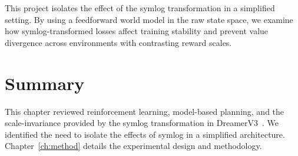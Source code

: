 This project isolates the effect of the symlog transformation in a simplified setting. By using a feedforward world model in the raw state space, we examine how symlog-transformed losses affect training stability and prevent value divergence across environments with contrasting reward scales.

\section{Summary}
\label{sec:lit_summary}

This chapter reviewed reinforcement learning, model-based planning, and the scale-invariance provided by the symlog transformation in DreamerV3~\citep{hafner2023dreamerv3}. We identified the need to isolate the effects of symlog in a simplified architecture. Chapter~\ref{ch:method} details the experimental design and methodology.